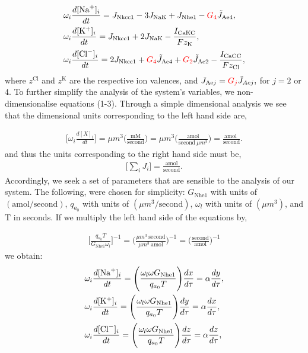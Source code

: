 \documentclass{svjour3}
\newcommand{\kplus}{{\rm K}^+}
\newcommand{\bkplus}{[{\rm K}^+]_i}
\newcommand{\na}{{\rm Na}^+}
\newcommand{\bna}{[{\rm Na}^+]_i}
\newcommand{\cl}{{\rm Cl}^-}
\newcommand{\bcl}{[{\rm Cl}^-]_i}
\begin{document}
\begin{align}
& \omega_i  \frac{d [\na]_i}{dt}=J_{\text{Nkcc1}}-3J_{\text{NaK}}+J_{\text{Nhe1}}-{\color{red}G_4}\tilde{J}_{\text{Ae4}},\\
& \omega_i \frac{d[\kplus]_i}{dt}=J_{\text{Nkcc1}}+2J_{\text{NaK}}-\frac{I_{\text{CaKC}}}{F z_{\text{K}}}, \\
& \omega_i \frac{d [\cl]_i}{dt}=2J_{\text{Nkcc1}}+{\color{red}G_4}\tilde{J}_{\text{Ae4}}+{\color{red}G_2}\tilde{J}_{\text{Ae2}}-\frac{I_{\text{CaCC}}}{F z_{\text{Cl}}},
\end{align}
where $z^{\text{Cl}}$ and $z^{\text{K}}$ are the respective ion valences, and $J_{\text{Ae}j}={\color{red}G_j} \tilde{J}_{Aej},$ for $j=2$ or $4$. To further simplify the analysis of the system's variables, we non-dimensionalise equations (1-3). Through a simple dimensional analysis we see that the dimensional units corresponding to the left hand side are, \par
\begin{align*}
\Bigg[\omega_i\frac{d[X]_i}{dt}\Bigg]=\mu m^3 \Bigg( \frac{\text{mM}}{\text{second}} \Bigg) =\mu m^3 \Bigg( \frac{\text{amol}}{\text{second} \ \mu m^3} \Bigg) =\frac{ \text{amol }}{\text{second}}.
\end{align*}
and thus the units corresponding to the right hand side must be,
\begin{align*}
\Bigg[ \sum_i J_i \Bigg]=\frac{\text{amol}}{\text{second}}.
\end{align*}
Accordingly, we seek a set of parameters that are sensible to the analysis of our system. The following, were chosen for simplicity: $G_{\text{Nhe1}}$ with units of $(\text{amol}/\text{second})$, $q_{a_0}$ with units of $(\mu m^3/ \text{second})$, $\omega_l$  with units of $(\mu m^3)$, and $\text{T}$ in seconds. If we multiply the left hand side of the equations by, \par
\begin{align*}
\Bigg[\frac{q_{a_0} T}{G_{\text{Nhe1}} \omega_l} \Bigg]^{-1} = \Bigg(\frac{\mu m^3 \ \text{second}}{\mu m^3 \ \text{amol}} \Bigg)^{-1}= \Bigg( \frac{\text{second}}{\text{amol}} \Bigg)^{-1}
\end{align*}
we obtain:
\begin{align*}
&  \omega_i  \frac{d \bna}{dt} = \Bigg( \frac{ \omega_l  \omega G_{\text{Nhe1}}}{q_{a_0} T } \Bigg) \frac{dx}{d\tau} =\alpha\frac{dy}{d\tau}, \\
& \omega_i  \frac{d \bkplus}{dt} = \Bigg( \frac{ \omega_l  \omega G_{\text{Nhe1}}}{q_{a_0} T } \Bigg) \frac{dy}{d\tau} =\alpha \frac{dx}{d\tau},\\
&  \omega_i  \frac{d \bcl }{dt} = \Bigg( \frac{ \omega_l  \omega G_{\text{Nhe1}}}{q_{a_0} T } \Bigg) \frac{dz}{d\tau} =\alpha \frac{dz}{d\tau},
\end{align*}
\end{document}
